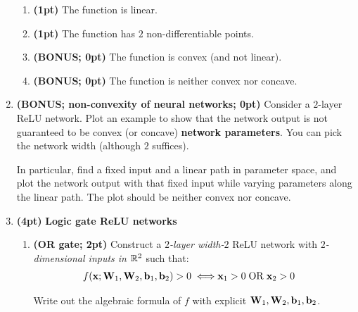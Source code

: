 \documentclass[12pt,letterpaper]{article}
\begin{document}
\begin{enumerate}
   \begin{enumerate}
       \item \textbf{(1pt)} The function is linear.
       
       \item \textbf{(1pt)} The function has $2$ non-differentiable points.
       
       \item \textbf{(BONUS; 0pt)} The function is convex (and not linear).
       
       \item \textbf{(BONUS; 0pt)} The function is neither convex nor concave.
       
   \end{enumerate}
   
  
   
   \item \textbf{(BONUS; non-convexity of neural networks; 0pt)} 
   Consider a $2$-layer ReLU network.
   Plot an example to show 
   that the network output is not guaranteed to be convex (or concave) \wrt \textbf{network parameters}.
   You can pick the network width (although $2$ suffices).
       
   In particular, find a fixed input and a linear path in parameter space, and plot the network output with that fixed input while varying parameters along the linear path. The plot should be neither convex nor concave.

   
   
   \item \textbf{(4pt)} \textbf{Logic gate ReLU networks}
   
    \begin{enumerate}
       \item \textbf{(OR gate; 2pt)} Construct a \emph{$2$-layer width-$2$} ReLU network with  \emph{$2$-dimensional inputs 
       in $\mathbb{R}^2$} 
       such that: \begin{align}
           f({\mathbf{x}}; {\mathbf{W}}_1, {\mathbf{W}}_2, {\mathbf{b}}_1, {\mathbf{b}}_2) > 0 \iff & {\mathbf{x}}_1 > 0 \mathrel{\mathrm{OR}} {\mathbf{x}}_2 > 0
       \end{align}
       
       Write out the algebraic formula of $f$ with explicit ${\mathbf{W}}_1, {\mathbf{W}}_2, {\mathbf{b}}_1, {\mathbf{b}}_2$.
       
       

\end{enumerate}
\end{enumerate}
\end{document}
